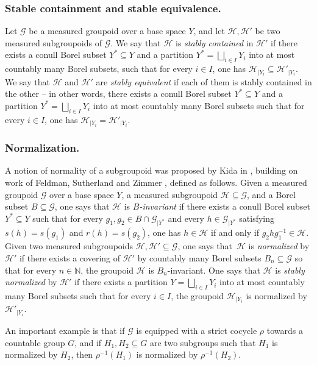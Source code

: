 \documentclass[JEP,XML,SOM,Unicode,NoFloatCountersInSection,published]{cedram}
\let\mathcal\mathscr
\theoremstyle{plain}
\theoremstyle{definition}
\let\Dunion\bigsqcup
\newcommand{\calg}{\mathcal{G}}
\newcommand{\calh}{\mathcal{H}}
\begin{document}
\subsubsection*{Stable containment and stable equivalence.} Let $\calg$ be a measured groupoid over a base space $Y$, and let $\calh,\calh'$ be two measured subgroupoids of $\calg$. We say that $\calh$ is \emph{stably contained} in $\calh'$ if there exists a conull Borel subset $Y^*\subseteq Y$ and a partition $Y^*=\Dunion_{i\in I}Y_i$ into at most countably many Borel subsets, such that for every $i\in I$, one has $\calh_{|Y_i}\subseteq\calh'_{|Y_i}$. We say that $\calh$ and $\calh'$ are \emph{stably equivalent} if each of them is stably contained in the other -- in other words, there exists a conull Borel subset $Y^*\subseteq Y$ and a partition $Y^*=\Dunion_{i\in I}Y_i$ into at most countably many Borel subsets such that for every $i\in I$, one has $\calh_{|Y_i}=\calh'_{|Y_i}$.

\subsubsection*{Normalization.}

A notion of normality of a subgroupoid was proposed by Kida in \cite[Chap.\,4, \S6.1]{Kid-memoir}, building on work of Feldman, Sutherland and Zimmer \cite{FSZ}, defined as follows. Given a measured groupoid $\calg$ over a base space $Y$, a measured subgroupoid $\calh\subseteq\calg$, and a Borel subset $B\subseteq\calg$, one says that $\calh$ is \emph{$B$-invariant} if there exists a conull Borel subset $Y^*\subseteq Y$ such that for every $g_1,g_2\in B\cap\calg_{|Y^*}$ and every $h\in\calg_{|Y^*}$ satisfying $s(h)=s(g_1)$ and $r(h)=s(g_2)$, one has $h\in\calh$ if and only if $g_2hg_1^{-1}\in\calh$. Given two measured subgroupoids $\calh,\calh'\subseteq\calg$, one says that~$\calh$ is \emph{normalized} by $\calh'$ if there exists a covering of $\calh'$ by countably many Borel subsets $B_n\subseteq\calg$ so that for every $n\in\mathbb{N}$, the groupoid $\calh$ is $B_n$-invariant. One says that $\calh$ is \emph{stably normalized} by $\calh'$ if there exists a partition $Y=\Dunion_{i\in I}Y_i$ into at most countably many Borel subsets such that for every $i\in I$, the groupoid $\calh_{|Y_i}$ is normalized by $\calh'_{|Y_i}$.

An important example is that if $\calg$ is equipped with a strict cocycle $\rho$ towards a countable group $G$, and if $H_1,H_2\subseteq G$ are two subgroups such that $H_1$ is normalized by $H_2$, then $\rho^{-1}(H_1)$ is normalized by $\rho^{-1}(H_2)$.
\end{document}
